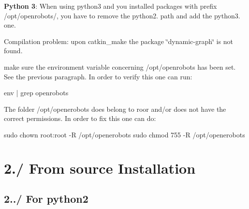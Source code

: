 \begin{DoxyEnumerate}
\item {\bfseries Python 3}\+: When using python3 and you installed packages with prefix /opt/openrobots/, you have to remove the python2. path and add the python3. one.
\item Compilation problem\+: upon catkin\+\_\+make the package \char`\"{}dynamic-\/graph\char`\"{} is not found.
\begin{DoxyEnumerate}
\item make sure the environment variable concerning /opt/openrobots has been set. See the previous paragraph. In order to verify this one can run\+: 
\begin{DoxyCode}
env | grep openrobots
\end{DoxyCode}

\item The folder /opt/openerobots does belong to roor and/or does not have the correct permissions. In order to fix this one can do\+: 
\begin{DoxyCode}
sudo chown root:root -R /opt/openerobots
sudo chmod 755 -R /opt/openerobots
\end{DoxyCode}

\end{DoxyEnumerate}
\end{DoxyEnumerate}\hypertarget{subpage_installation_install_sec_source}{}\section{2./ From source Installation}\label{subpage_installation_install_sec_source}
\hypertarget{subpage_installation_install_subsec_python2}{}\subsection{2../ For python2}\label{subpage_installation_install_subsec_python2}

